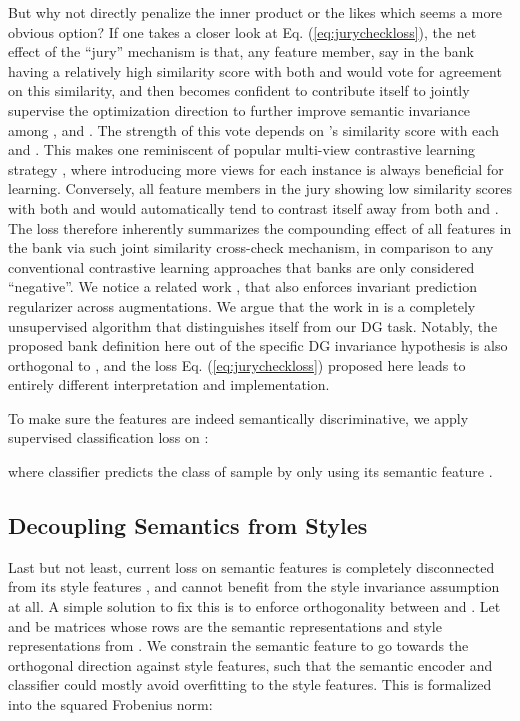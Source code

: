 \documentclass[10pt,twocolumn,letterpaper]{article}
\newcommand{\0}{{\bf 0}}
\begin{document}
But why not directly penalize the inner product  or the likes which seems a more obvious option? If one takes a closer look at Eq. (\ref{eq:jurycheckloss}), the net effect of the ``jury'' mechanism is that, any feature member, say  in the bank  having a relatively high similarity score with both  and  would vote for agreement on this similarity, and then  becomes confident to contribute itself to jointly supervise the optimization direction to further improve semantic invariance among ,  and . The strength of this vote depends on 's similarity score with each  and . This makes one reminiscent of popular multi-view contrastive learning strategy \cite{caron2020unsupervised, tian2019contrastive}, where introducing more views for each instance is always beneficial for learning. Conversely, all feature members in the jury showing low similarity scores with both  and   would automatically tend to contrast itself away from both  and . The loss therefore inherently summarizes the compounding effect of all features in the bank via such joint similarity cross-check mechanism, in comparison to any conventional contrastive learning approaches that banks are only considered ``negative''. We notice a related work \cite{mitrovic2020representation}, that also enforces invariant prediction regularizer across augmentations. We argue that the work in \cite{mitrovic2020representation} is a completely unsupervised algorithm that distinguishes itself from our DG task. Notably, the proposed bank definition here out of the specific DG invariance hypothesis is also orthogonal to \cite{mitrovic2020representation}, and the loss Eq. (\ref{eq:jurycheckloss}) proposed here leads to entirely different interpretation and implementation.

To make sure the features are indeed semantically discriminative, we apply supervised classification loss on :

where classifier  predicts the class of sample  by only using its semantic feature .

\subsection{Decoupling Semantics from Styles}
Last but not least, current loss on semantic features  is completely disconnected from its style features , and cannot benefit from the style invariance assumption at all. A simple solution to fix this is to enforce orthogonality \cite{bousmalis2016domain} between  and . Let  and  be matrices whose rows are the semantic representations  and style representations  from . We constrain the semantic feature to go towards the orthogonal direction against style features, such that the semantic encoder  and classifier  could mostly avoid overfitting to the style features. This is formalized into the squared Frobenius norm:
\end{document}
